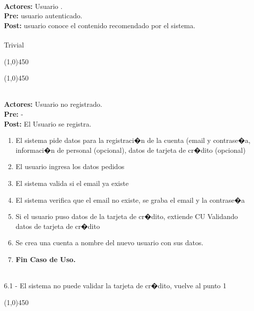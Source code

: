 \documentclass[11pt, a4paper, spanish]{article}
\begin{document}
 \\
\textbf{Actores:} Usuario . \\
\textbf{Pre:} usuario autenticado. \\
\textbf{Post:} usuario conoce el contenido recomendado por el sistema.\\
 \\
	Trivial\\
\begin{center} \line(1,0){450} \end{center}
\newpage
\begin{center} \line(1,0){450} \end{center}

 \\
\textbf{Actores:} Usuario no registrado. \\
\textbf{Pre:} - \\
\textbf{Post:} El Usuario se registra.\\
\begin{enumerate}
	\item El sistema pide datos para la registraci�n de la cuenta (email y contrase�a, informaci�n de personal (opcional), datos de tarjeta de cr�dito (opcional)
	\item El usuario ingresa los datos pedidos
	\item El sistema valida si el email ya existe
	\item El sistema verifica que el email no existe, se graba el email y la contrase�a
	\item Si el usuario puso datos de la tarjeta de cr�dito, extiende CU Validando datos de tarjeta de cr�dito
	\item Se crea una cuenta a nombre del nuevo usuario con sus datos.
	\item \textbf{Fin Caso de Uso.}
\end{enumerate}
 \\
6.1 - El sistema no puede validar la tarjeta de cr�dito, vuelve al punto 1

\begin{center} \line(1,0){450} \end{center}
\end{document}
